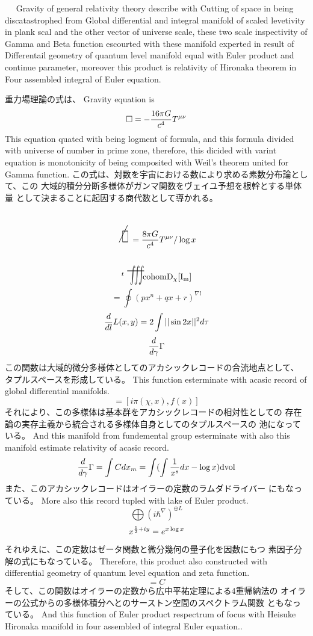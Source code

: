 \documentclass{jsarticle}
\begin{document}
  　 Gravity of general relativity theory describe with Cutting of space
in being discatastrophed from Global differential and integral manifold
of scaled levetivity in plank scal and the other vector of universe
scale, these two scale inspectivity of Gamma and Beta function escourted
with these manifold experted in result of Differentail geometry of
quantum level manifold equal with Euler product and continue parameter,
moreover this product is relativity of Hironaka theorem in Four assembled
integral of Euler equation.

 重力場理論の式は、
  Gravity equation is
  $$ \square = - {16 \pi G \over c^4}T^{\mu\nu} $$
  This equation quated with being logment of formula, and
  this formula divided with universe of number in prime zone,
  therefore, this dicided with varint equation is monotonicity of
  being composited with Weil's theorem united for Gamma function.
  この式は、対数を宇宙における数により求める素数分布論として、この
  大域的積分分断多様体がガンマ関数をヴェイユ予想を根幹とする単体量
  として決まることに起因する商代数として導かれる。
  $$ \scalebox{1}[2]{\alearletter} = 
  {{{{8 \pi G} \over {c^4}}T^{\mu\nu}}/ \log x} $$
  $$ {}^{t}\scalebox{1}[2]{\variiint}\mathrm{cohom D_{\chi}[I_m]}$$
  $$ = \oint {(px^n + qx + r)^{\nabla l}} $$
  $$ {d \over d l}L(x,y) = 2 \int ||\sin 2x||^{2}d \tau $$
  $$ {d \over d \gamma}\Gamma $$
  この関数は大域的微分多様体としてのアカシックレコードの合流地点として、
  タプルスペースを形成している。
  This function esterminate with acasic record of global differential
  manifolds.
  $$ = [i \pi (\chi, x), f(x)] $$
  それにより、この多様体は基本群をアカシックレコードの相対性としての
  存在論の実存主義から統合される多様体自身としてのタプルスペースの
  池になっている。
  And this manifold from fundemental group esterminate with
  also this manifold estimate relativity of acasic record.
  $$ {d \over d \gamma}\Gamma = \int C dx_m = \int(\int {1 \over x^s}dx
  - \log x)\mathrm{dvol} $$
  また、このアカシックレコードはオイラーの定数のラムダドライバー
  にもなっている。
  More also this record tupled with lake of Euler product.
  $$ \bigoplus({i \hbar^{\nabla}})^{\oplus L} $$
  $$ x^{{1 \over 2} + iy} = e^{x \log x} $$
  それゆえに、この定数はゼータ関数と微分幾何の量子化を因数にもつ
  素因子分解の式にもなっている。
  Therefore, this product also constructed with differential geometry
  of quantum level equation and zeta function.
  $$ = C $$ 
  そして、この関数はオイラーの定数から広中平祐定理による4重帰納法の
  オイラーの公式からの多様体積分へとのサーストン空間のスペクトラム関数
  ともなっている。
  And this function of Euler product respectrum of focus with
  Heisuke Hironaka manifold in four assembled of integral Euler equation.. 
\end{document}
